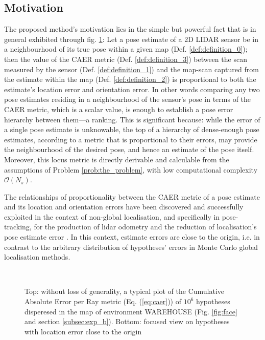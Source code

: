 \subsection{Motivation}
\label{subsec:motivation}

The proposed method's motivation lies in the simple but powerful fact that is
in general exhibited through fig. \ref{fig:motivation_caer}: Let a pose
estimate of a 2D LIDAR sensor be in a neighbourhood of its true pose within a
given map (Def. \ref{def:definition_0}); then the value of the CAER metric
(Def.  \ref{def:definition_3}) between the scan measured by the sensor (Def.
\ref{def:definition_1}) and the map-scan captured from the estimate within the
map (Def. \ref{def:definition_2}) is proportional to both the estimate's
location error and orientation error. In other words comparing any two pose
estimates residing in a neighbourhood of the sensor's pose in terms of the CAER
metric, which is a scalar value, is enough to establish a pose error hierarchy
between them---a ranking.
This is significant because: while the error of a
single pose estimate is unknowable, the top of a hierarchy of dense-enough pose
estimates, according to a metric that is proportional to their errors, may
provide the neighbourhood of the desired pose, and hence an estimate of the
pose itself. Moreover, this locus metric is directly derivable and calculable
from the assumptions of Problem \ref{prob:the_problem}, with low computational
complexity $\mathcal{O}(N_s)$.

The relationships of proportionality between the CAER metric of a pose
estimate and its location and orientation errors have been discovered and
successfully exploited in the context of non-global localisation, and
specifically in pose-tracking, for the production of lidar odometry
\cite{Filotheou2022f} and the reduction of localisation's pose estimate error
\cite{Filotheou2023a}. In this context, estimate errors are close to the
origin, i.e. in contrast to the arbitrary distribution of hypotheses' errors in
Monte Carlo global localisation methods.


\begin{figure}\vspace{-1.5cm}
  \subfloat{\hspace{0.5cm}}\vspace{-1.5cm}\\
  \subfloat{\hspace{-0.3cm}}
  \caption{\small Top: without loss of generality, a typical plot of the
           Cumulative Absolute Error per Ray metric (Eq. (\ref{eq:caer})) of
           $10^6$ hypotheses disperesed in the map of environment WAREHOUSE
           (Fig. \ref{fig:face} and section \ref{subsec:exp_b}). Bottom:
           focused view on hypotheses with location error close to the origin}
  \vspace{-0.5cm}
  \label{fig:motivation_caer}
\end{figure}



